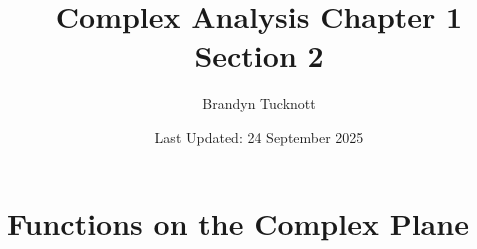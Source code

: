 \documentclass{exam}
\title{Complex Analysis Chapter 1 Section 2}
\author{Brandyn Tucknott}
\date{Last Updated: 24 September 2025}
\begin{document}
\maketitle

\section{Functions on the Complex Plane}
\end{document}
